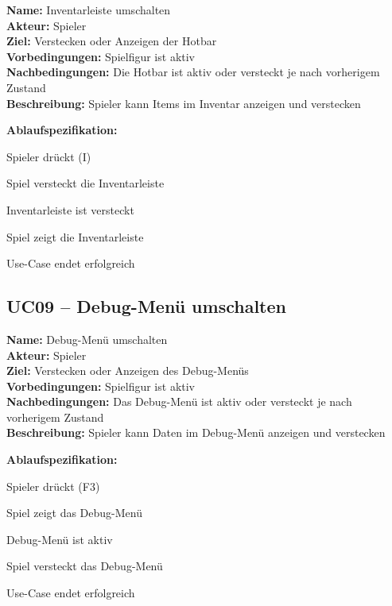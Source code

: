 \documentclass{article}
\begin{document}
\textbf{Name:} Inventarleiste umschalten \\
\textbf{Akteur:} Spieler \\
\textbf{Ziel:} Verstecken oder Anzeigen der Hotbar \\
\textbf{Vorbedingungen:} Spielfigur ist aktiv \\
\textbf{Nachbedingungen:} Die Hotbar ist aktiv oder versteckt je nach vorherigem Zustand \\
\textbf{Beschreibung:} Spieler kann Items im Inventar anzeigen und verstecken

\textbf{Ablaufspezifikation:}
\begin{description}[style=nextline,leftmargin=1.9cm,labelwidth=1.6cm]
  \item[1.] Spieler drückt (I)
  \item[2.] Spiel versteckt die Inventarleiste
  \item[2a.] Inventarleiste ist versteckt
  \item[2a.1.] Spiel zeigt die Inventarleiste
  \item[3.] Use-Case endet erfolgreich
\end{description}

\subsection*{UC09 – Debug-Menü umschalten}

\textbf{Name:} Debug-Menü umschalten \\
\textbf{Akteur:} Spieler \\
\textbf{Ziel:} Verstecken oder Anzeigen des Debug-Menüs \\
\textbf{Vorbedingungen:} Spielfigur ist aktiv \\
\textbf{Nachbedingungen:} Das Debug-Menü ist aktiv oder versteckt je nach vorherigem Zustand \\
\textbf{Beschreibung:} Spieler kann Daten im Debug-Menü anzeigen und verstecken

\textbf{Ablaufspezifikation:}
\begin{description}[style=nextline,leftmargin=1.9cm,labelwidth=1.6cm]
  \item[1.] Spieler drückt (F3)
  \item[2.] Spiel zeigt das Debug-Menü
  \item[2a.] Debug-Menü ist aktiv
  \item[2a.1.] Spiel versteckt das Debug-Menü
  \item[3.] Use-Case endet erfolgreich
\end{description}
\end{document}
